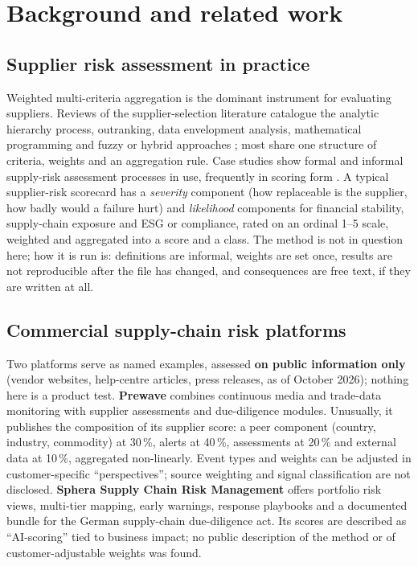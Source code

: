 \documentclass[10pt,twocolumn,a4paper]{article}
\begin{document}
\section{Background and related work}
\label{sec:background}

\subsection{Supplier risk assessment in practice}
Weighted multi-criteria aggregation is the dominant instrument for evaluating suppliers.
Reviews of the supplier-selection literature catalogue the analytic hierarchy process,
outranking, data envelopment analysis, mathematical programming and fuzzy or hybrid
approaches \cite{ho2010,chai2013}; most share one structure of criteria, weights and an
aggregation rule. Case studies show formal and informal supply-risk assessment processes
in use, frequently in scoring form \cite{zsidisin2004}. A typical supplier-risk scorecard
has a \emph{severity} component (how replaceable is the supplier, how badly would a
failure hurt) and \emph{likelihood} components for financial stability, supply-chain
exposure and ESG or compliance, rated on an ordinal 1--5 scale, weighted and aggregated
into a score and a class. The method is not in question here; how it is run is:
definitions are informal, weights are set once, results are not reproducible after the
file has changed, and consequences are free text, if they are written at all.

\subsection{Commercial supply-chain risk platforms}
Two platforms serve as named examples, assessed \textbf{on public information only}
(vendor websites, help-centre articles, press releases, as of October 2026); nothing here
is a product test. \textbf{Prewave} combines continuous media and trade-data monitoring
with supplier assessments and due-diligence modules. Unusually, it publishes the
composition of its supplier score: a peer component (country, industry, commodity) at
30\,\%, alerts at 40\,\%, assessments at 20\,\% and external data at 10\,\%, aggregated
non-linearly. Event types and weights can be adjusted in customer-specific
``perspectives''; source weighting and signal classification are not disclosed.
\textbf{Sphera Supply Chain Risk Management} offers portfolio risk views, multi-tier
mapping, early warnings, response playbooks and a documented bundle for the German
supply-chain due-diligence act. Its scores are described as ``AI-scoring'' tied to
business impact; no public description of the method or of customer-adjustable weights
was found.
\end{document}
